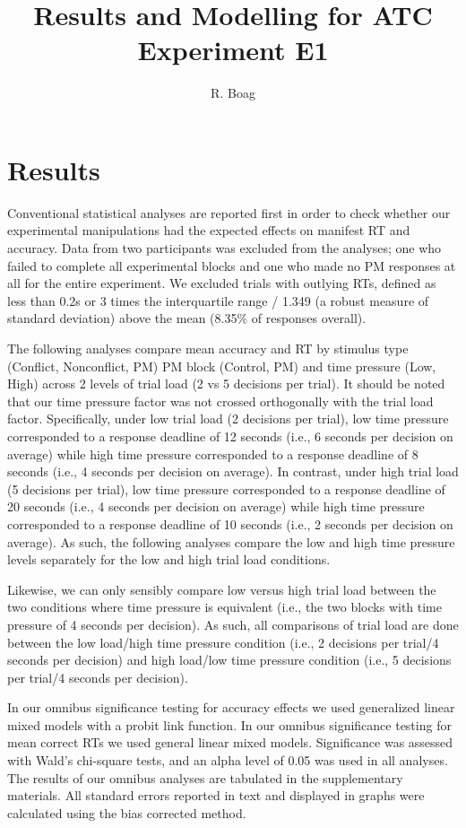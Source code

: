 \documentclass[11pt,]{article}
\title{Results and Modelling for ATC Experiment E1}
\author{R. Boag}
\date{}
\begin{document}
\maketitle

\section{Results}\label{results}

Conventional statistical analyses are reported first in order to check
whether our experimental manipulations had the expected effects on
manifest RT and accuracy. Data from two participants was excluded from
the analyses; one who failed to complete all experimental blocks and one
who made no PM responses at all for the entire experiment. We excluded
trials with outlying RTs, defined as less than 0.2s or 3 times the
interquartile range / 1.349 (a robust measure of standard deviation)
above the mean (8.35\% of responses overall).

The following analyses compare mean accuracy and RT by stimulus type
(Conflict, Nonconflict, PM) PM block (Control, PM) and time pressure
(Low, High) across 2 levels of trial load (2 vs 5 decisions per trial).
It should be noted that our time pressure factor was not crossed
orthogonally with the trial load factor. Specifically, under low trial
load (2 decisions per trial), low time pressure corresponded to a
response deadline of 12 seconds (i.e., 6 seconds per decision on
average) while high time pressure corresponded to a response deadline of
8 seconds (i.e., 4 seconds per decision on average). In contrast, under
high trial load (5 decisions per trial), low time pressure corresponded
to a response deadline of 20 seconds (i.e., 4 seconds per decision on
average) while high time pressure corresponded to a response deadline of
10 seconds (i.e., 2 seconds per decision on average). As such, the
following analyses compare the low and high time pressure levels
separately for the low and high trial load conditions.

Likewise, we can only sensibly compare low versus high trial load
between the two conditions where time pressure is equivalent (i.e., the
two blocks with time pressure of 4 seconds per decision). As such, all
comparisons of trial load are done between the low load/high time
pressure condition (i.e., 2 decisions per trial/4 seconds per decision)
and high load/low time pressure condition (i.e., 5 decisions per trial/4
seconds per decision).

In our omnibus significance testing for accuracy effects we used
generalized linear mixed models with a probit link function. In our
omnibus significance testing for mean correct RTs we used general linear
mixed models. Significance was assessed with Wald's chi-square tests,
and an alpha level of 0.05 was used in all analyses. The results of our
omnibus analyses are tabulated in the supplementary materials. All
standard errors reported in text and displayed in graphs were calculated
using the bias corrected method.
\end{document}
